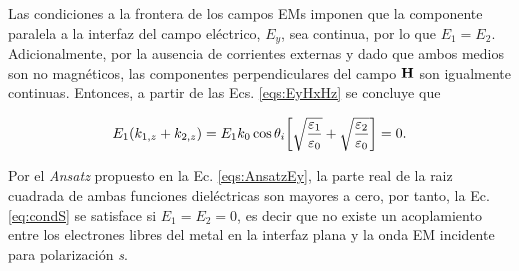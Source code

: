 \noindent   Las condiciones a la frontera de los campos EMs imponen que la componente paralela a la interfaz del campo eléctrico, $E_y$, sea continua, por lo que $E_1 = E_2$. Adicionalmente, por la ausencia de corrientes externas y dado que ambos medios son no magnéticos, las componentes perpendiculares del campo $\vb{H}$ son igualmente continuas. Entonces, a partir de las Ecs. \eqref{eqs:EyHxHz} se concluye que

	\begin{align}
	E_1\qty(k_{1,z}+k_{2,z})= E_1 k_0\cos\theta_i \qty[\sqrt{\frac{\varepsilon_1}{\varepsilon_0}} + \sqrt{\frac{\varepsilon_2}{\varepsilon_0}}] = 0. \label{eq:condS}
	\end{align}
	
\noindent Por el \emph{Ansatz} propuesto en la Ec. \eqref{eqs:AnsatzEy}, la parte real de la raiz cuadrada de ambas funciones dieléctricas son mayores a cero, por tanto, la Ec. \eqref{eq:condS} se satisface si $E_1 = E_2 = 0$, es decir  que no existe un acoplamiento entre los electrones libres del metal en la interfaz plana y la onda EM incidente para polarización \emph{s}.

